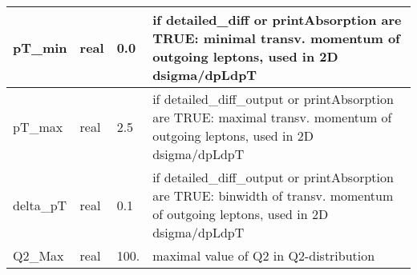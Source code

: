 \documentclass{article}
\begin{document}
\begin{longtable}{llll}
\midrule
pT\_min & \begin{minipage}[t]{2cm}real\end{minipage} & \begin{minipage}[t]{2cm}0.0\end{minipage} & \begin{minipage}[t]{12cm}if detailed\_diff or printAbsorption are TRUE: minimal transv. momentum  of outgoing leptons, used in 2D dsigma/dpLdpT\end{minipage}\\*
\midrule
pT\_max & \begin{minipage}[t]{2cm}real\end{minipage} & \begin{minipage}[t]{2cm}2.5\end{minipage} & \begin{minipage}[t]{12cm}if detailed\_diff\_output or printAbsorption are TRUE: maximal transv. momentum  of outgoing leptons, used in 2D dsigma/dpLdpT\end{minipage}\\*
\midrule
delta\_pT & \begin{minipage}[t]{2cm}real\end{minipage} & \begin{minipage}[t]{2cm}0.1\end{minipage} & \begin{minipage}[t]{12cm}if detailed\_diff\_output or printAbsorption are TRUE: binwidth of transv. momentum of outgoing leptons, used in 2D dsigma/dpLdpT\end{minipage}\\*
\midrule
Q2\_Max & \begin{minipage}[t]{2cm}real\end{minipage} & \begin{minipage}[t]{2cm}100.\end{minipage} & \begin{minipage}[t]{12cm}maximal value of Q2 in Q2-distribution\end{minipage}\\*
\bottomrule
\end{longtable}
{ }



\end{document}
